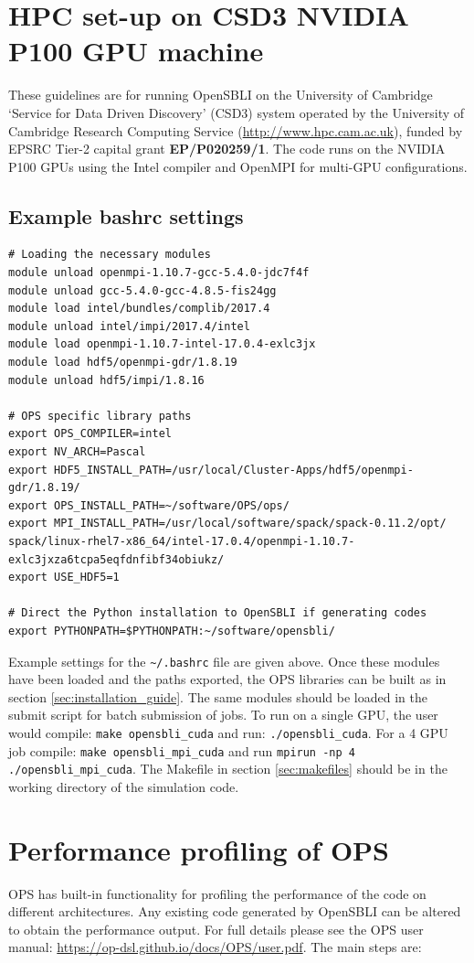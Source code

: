 \documentclass[11pt]{article}
\begin{document}
\section{HPC set-up on CSD3 NVIDIA P100 GPU machine}
These guidelines are for running OpenSBLI on the University of Cambridge `Service for Data Driven Discovery' (CSD3) system operated by the University of Cambridge Research Computing Service (\url{http://www.hpc.cam.ac.uk}), funded by EPSRC Tier-2 capital grant \textbf{EP/P020259/1}. The code runs on the NVIDIA P100 GPUs using the Intel compiler and OpenMPI for multi-GPU configurations.

\subsection{Example bashrc settings}
\begin{verbatim}
# Loading the necessary modules
module unload openmpi-1.10.7-gcc-5.4.0-jdc7f4f 
module unload gcc-5.4.0-gcc-4.8.5-fis24gg
module load intel/bundles/complib/2017.4
module unload intel/impi/2017.4/intel
module load openmpi-1.10.7-intel-17.0.4-exlc3jx
module load hdf5/openmpi-gdr/1.8.19
module unload hdf5/impi/1.8.16

# OPS specific library paths
export OPS_COMPILER=intel
export NV_ARCH=Pascal
export HDF5_INSTALL_PATH=/usr/local/Cluster-Apps/hdf5/openmpi-gdr/1.8.19/
export OPS_INSTALL_PATH=~/software/OPS/ops/
export MPI_INSTALL_PATH=/usr/local/software/spack/spack-0.11.2/opt/
spack/linux-rhel7-x86_64/intel-17.0.4/openmpi-1.10.7-exlc3jxza6tcpa5eqfdnfibf34obiukz/
export USE_HDF5=1

# Direct the Python installation to OpenSBLI if generating codes
export PYTHONPATH=$PYTHONPATH:~/software/opensbli/
\end{verbatim}
Example settings for the \verb|~/.bashrc| file are given above. Once these modules have been loaded and the paths exported, the OPS libraries can be built as in section \ref{sec:installation_guide}. The same modules should be loaded in the submit script for batch submission of jobs. To run on a single GPU, the user would compile: \verb|make opensbli_cuda| and run: \verb|./opensbli_cuda|. For a 4 GPU job compile: \verb|make opensbli_mpi_cuda| and run \verb|mpirun -np 4 ./opensbli_mpi_cuda|. The Makefile in section \ref{sec:makefiles} should be in the working directory of the simulation code.

\newpage
\section{Performance profiling of OPS}\label{sec:ops_performance}
OPS has built-in functionality for profiling the performance of the code on different architectures. Any existing code generated by OpenSBLI can be altered to obtain the performance output. For full details please see the OPS user manual: \url{https://op-dsl.github.io/docs/OPS/user.pdf}. The main steps are:
\end{document}
